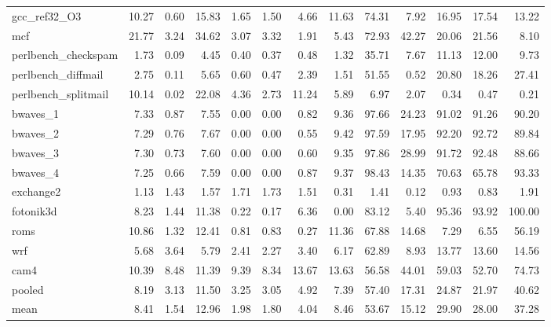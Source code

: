 \documentclass[10pt,a4paper]{article}
\begin{document}
{\begin{longtable}{@{}lrrrrrrrrrrrr@{}}
gcc\_ref32\_O3 & 10.27 & 0.60 & 15.83 & 1.65 & 1.50 & 4.66 & 11.63 & 74.31 & 7.92 & 16.95 & 17.54 & 13.22 \\
mcf & 21.77 & 3.24 & 34.62 & 3.07 & 3.32 & 1.91 & 5.43 & 72.93 & 42.27 & 20.06 & 21.56 & 8.10 \\
perlbench\_checkspam & 1.73 & 0.09 & 4.45 & 0.40 & 0.37 & 0.48 & 1.32 & 35.71 & 7.67 & 11.13 & 12.00 & 9.73 \\
perlbench\_diffmail & 2.75 & 0.11 & 5.65 & 0.60 & 0.47 & 2.39 & 1.51 & 51.55 & 0.52 & 20.80 & 18.26 & 27.41 \\
perlbench\_splitmail & 10.14 & 0.02 & 22.08 & 4.36 & 2.73 & 11.24 & 5.89 & 6.97 & 2.07 & 0.34 & 0.47 & 0.21 \\
bwaves\_1 & 7.33 & 0.87 & 7.55 & 0.00 & 0.00 & 0.82 & 9.36 & 97.66 & 24.23 & 91.02 & 91.26 & 90.20 \\
bwaves\_2 & 7.29 & 0.76 & 7.67 & 0.00 & 0.00 & 0.55 & 9.42 & 97.59 & 17.95 & 92.20 & 92.72 & 89.84 \\
bwaves\_3 & 7.30 & 0.73 & 7.60 & 0.00 & 0.00 & 0.60 & 9.35 & 97.86 & 28.99 & 91.72 & 92.48 & 88.66 \\
bwaves\_4 & 7.25 & 0.66 & 7.59 & 0.00 & 0.00 & 0.87 & 9.37 & 98.43 & 14.35 & 70.63 & 65.78 & 93.33 \\
exchange2 & 1.13 & 1.43 & 1.57 & 1.71 & 1.73 & 1.51 & 0.31 & 1.41 & 0.12 & 0.93 & 0.83 & 1.91 \\
fotonik3d & 8.23 & 1.44 & 11.38 & 0.22 & 0.17 & 6.36 & 0.00 & 83.12 & 5.40 & 95.36 & 93.92 & 100.00 \\
roms & 10.86 & 1.32 & 12.41 & 0.81 & 0.83 & 0.27 & 11.36 & 67.88 & 14.68 & 7.29 & 6.55 & 56.19 \\
wrf & 5.68 & 3.64 & 5.79 & 2.41 & 2.27 & 3.40 & 6.17 & 62.89 & 8.93 & 13.77 & 13.60 & 14.56 \\
cam4 & 10.39 & 8.48 & 11.39 & 9.39 & 8.34 & 13.67 & 13.63 & 56.58 & 44.01 & 59.03 & 52.70 & 74.73 \\
\midrule
pooled & 8.19 & 3.13 & 11.50 & 3.25 & 3.05 & 4.92 & 7.39 & 57.40 & 17.31 & 24.87 & 21.97 & 40.62 \\
mean & 8.41 & 1.54 & 12.96 & 1.98 & 1.80 & 4.04 & 8.46 & 53.67 & 15.12 & 29.90 & 28.00 & 37.28 \\
\end{longtable}
}
\end{document}

